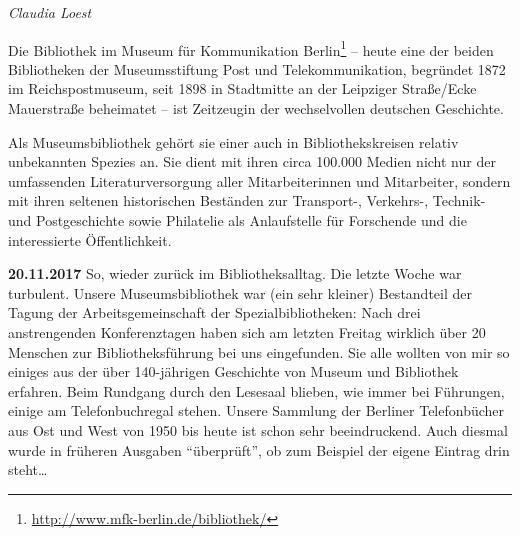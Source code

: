 \documentclass[a4paper,
fontsize=11pt,
oneside,
numbers=noperiodatend,
parskip=half-,
bibliography=totoc,
final
]{scrartcl}
\begin{document}
\textit{Claudia Loest}

Die Bibliothek im Museum für Kommunikation Berlin\footnote{\url{http://www.mfk-berlin.de/bibliothek/}}
-- heute eine der beiden Bibliotheken der Museumsstiftung Post und
Telekommunikation, begründet 1872 im Reichspostmuseum, seit 1898 in
Stadtmitte an der Leipziger Straße/Ecke Mauerstraße beheimatet -- ist
Zeitzeugin der wechselvollen deutschen Geschichte.

Als Museumsbibliothek gehört sie einer auch in Bibliothekskreisen
relativ unbekannten Spezies an. Sie dient mit ihren circa 100.000 Medien
nicht nur der umfassenden Literaturversorgung aller Mitarbeiterinnen und
Mitarbeiter, sondern mit ihren seltenen historischen Beständen zur
Transport-, Verkehrs-, Technik- und Postgeschichte sowie Philatelie als
Anlaufstelle für Forschende und die interessierte Öffentlichkeit.

\textbf{20.11.2017} So, wieder zurück im Bibliotheksalltag. Die letzte
Woche war turbulent. Unsere Museumsbibliothek war (ein sehr kleiner)
Bestandteil der Tagung der Arbeitsgemeinschaft der Spezialbibliotheken:
Nach drei anstrengenden Konferenztagen haben sich am letzten Freitag
wirklich über 20 Menschen zur Bibliotheksführung bei uns eingefunden.
Sie alle wollten von mir so einiges aus der über 140-jährigen Geschichte
von Museum und Bibliothek erfahren. Beim Rundgang durch den Lesesaal
blieben, wie immer bei Führungen, einige am Telefonbuchregal stehen.
Unsere Sammlung der Berliner Telefonbücher aus Ost und West von 1950 bis
heute ist schon sehr beeindruckend. Auch diesmal wurde in früheren
Ausgaben \enquote{überprüft}, ob zum Beispiel der eigene Eintrag drin
steht\ldots{}
\end{document}
